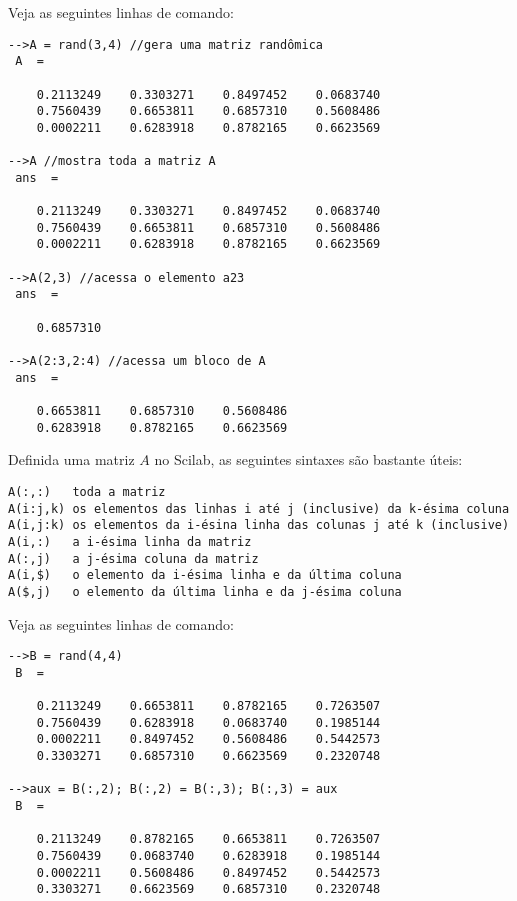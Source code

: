 \documentclass[main.tex]{subfiles}
\begin{document}
\begin{ex}
  Veja as seguintes linhas de comando:
\begin{verbatim}
-->A = rand(3,4) //gera uma matriz randômica
 A  =
 
    0.2113249    0.3303271    0.8497452    0.0683740  
    0.7560439    0.6653811    0.6857310    0.5608486  
    0.0002211    0.6283918    0.8782165    0.6623569  
 
-->A //mostra toda a matriz A
 ans  =
 
    0.2113249    0.3303271    0.8497452    0.0683740  
    0.7560439    0.6653811    0.6857310    0.5608486  
    0.0002211    0.6283918    0.8782165    0.6623569  
 
-->A(2,3) //acessa o elemento a23
 ans  =
 
    0.6857310  
 
-->A(2:3,2:4) //acessa um bloco de A
 ans  =
 
    0.6653811    0.6857310    0.5608486  
    0.6283918    0.8782165    0.6623569  
\end{verbatim}
\end{ex}

Definida uma matriz $A$ no Scilab, as seguintes sintaxes são bastante úteis:
\begin{verbatim}
A(:,:)   toda a matriz
A(i:j,k) os elementos das linhas i até j (inclusive) da k-ésima coluna
A(i,j:k) os elementos da i-ésina linha das colunas j até k (inclusive)
A(i,:)   a i-ésima linha da matriz
A(:,j)   a j-ésima coluna da matriz
A(i,$)   o elemento da i-ésima linha e da última coluna
A($,j)   o elemento da última linha e da j-ésima coluna
\end{verbatim}

\begin{ex}
Veja as seguintes linhas de comando:
\begin{verbatim}
-->B = rand(4,4)
 B  =
 
    0.2113249    0.6653811    0.8782165    0.7263507  
    0.7560439    0.6283918    0.0683740    0.1985144  
    0.0002211    0.8497452    0.5608486    0.5442573  
    0.3303271    0.6857310    0.6623569    0.2320748  
 
-->aux = B(:,2); B(:,2) = B(:,3); B(:,3) = aux
 B  =
 
    0.2113249    0.8782165    0.6653811    0.7263507  
    0.7560439    0.0683740    0.6283918    0.1985144  
    0.0002211    0.5608486    0.8497452    0.5442573  
    0.3303271    0.6623569    0.6857310    0.2320748  
\end{verbatim}
\end{ex}
\end{document}
